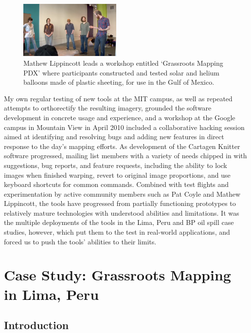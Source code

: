 \documentclass[11pt,oneside,notitlepage]{report}
\begin{document}
{{\begin{figure}
	\begin{flushright}
		\includegraphics[width=0.45\textwidth]{images/lippincott-workshop.png}
		\caption{Mathew Lippincott leads a workshop entitled `Grassroots Mapping PDX' where participants constructed and tested solar and helium balloons made of plastic sheeting, for use in the Gulf of Mexico.}
	\end{flushright}
\end{figure}

My own regular testing of new tools at the MIT campus, as well as repeated attempts to orthorectify the resulting imagery, grounded the software development in concrete usage and experience, and a workshop at the Google campus in Mountain View in April 2010 included a collaborative hacking session aimed at identifying and resolving bugs and adding new features in direct response to the day's mapping efforts. 
As development of the Cartagen Knitter software progressed, mailing list members with a variety of needs chipped in with suggestions, bug reports, and feature requests, including the ability to lock images when finished warping, revert to original image proportions, and use keyboard shortcuts for common commands. Combined with test flights and experimentation by active community members such as Pat Coyle and Mathew Lippincott, the tools have progressed from partially functioning prototypes to relatively mature technologies with understood abilities and limitations. It was the multiple deployments of the tools in the Lima, Peru and BP oil spill case studies, however, which put them to the test in real-world applications, and forced us to push the tools' abilities to their limits. 

\chapter{Case Study: Grassroots Mapping in Lima, Peru}
\label{chap:peru}

\section{Introduction}

}}
\end{document}

